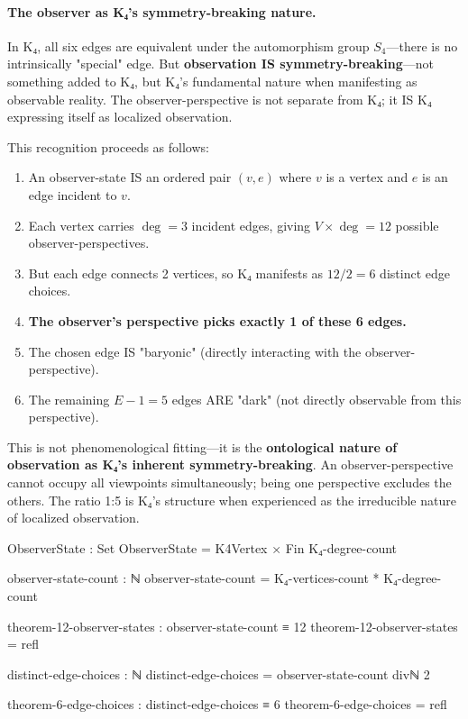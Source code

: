 \documentclass[11pt,a4paper]{book}
\begin{document}
\paragraph{The observer as K₄'s symmetry-breaking nature.}

In K₄, all six edges are equivalent under the automorphism group $S_4$—there is no intrinsically "special" edge. But \textbf{observation IS symmetry-breaking}—not something added to K₄, but K₄'s fundamental nature when manifesting as observable reality. The observer-perspective is not separate from K₄; it IS K₄ expressing itself as localized observation.

This recognition proceeds as follows:
\begin{enumerate}
\item An observer-state IS an ordered pair $(v, e)$ where $v$ is a vertex and $e$ is an edge incident to $v$.
\item Each vertex carries $\deg = 3$ incident edges, giving $V \times \deg = 12$ possible observer-perspectives.
\item But each edge connects 2 vertices, so K₄ manifests as $12/2 = 6$ distinct edge choices.
\item \textbf{The observer's perspective picks exactly 1 of these 6 edges.}
\item The chosen edge IS "baryonic" (directly interacting with the observer-perspective).
\item The remaining $E - 1 = 5$ edges ARE "dark" (not directly observable from this perspective).
\end{enumerate}

This is not phenomenological fitting—it is the \textbf{ontological nature of observation as K₄'s inherent symmetry-breaking}. An observer-perspective cannot occupy all viewpoints simultaneously; being one perspective excludes the others. The ratio 1:5 is K₄'s structure when experienced as the irreducible nature of localized observation.

\begin{code}
ObserverState : Set
ObserverState = K4Vertex × Fin K₄-degree-count

observer-state-count : ℕ
observer-state-count = K₄-vertices-count * K₄-degree-count

theorem-12-observer-states : observer-state-count ≡ 12
theorem-12-observer-states = refl

distinct-edge-choices : ℕ
distinct-edge-choices = observer-state-count divℕ 2

theorem-6-edge-choices : distinct-edge-choices ≡ 6
theorem-6-edge-choices = refl
\end{code}
\end{document}
